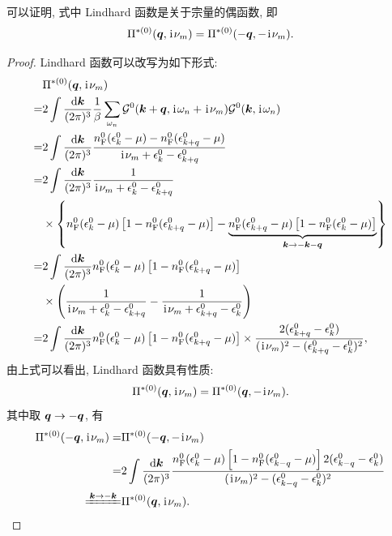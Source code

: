 可以证明, 式中 Lindhard 函数是关于宗量的偶函数, 即
\begin{equation}
    \Pi^{*(0)}(\boldsymbol{q},\hspace{0.1em}\mathrm{i}\hspace{0.1em}\nu_m)=\Pi^{*(0)}(-\boldsymbol{q},-\hspace{0.1em}\mathrm{i}\hspace{0.1em}\nu_m).
\end{equation}
\begin{proof}
    Lindhard 函数可以改写为如下形式:
  \begin{align}
         &   \Pi^{*(0)}(\boldsymbol{q},\hspace{0.1em}\mathrm{i}\hspace{0.1em}\nu_m)\nonumber\\
=&2\int\frac{\mathrm{d}\boldsymbol{k}}{(2\pi)^3}\frac{1}{\beta}\sum_{\omega_n}\mathcal{G}^{0}(\boldsymbol{k}+\boldsymbol{q},\hspace{0.1em}\mathrm{i}\hspace{0.1em}\omega_n+\hspace{0.1em}\mathrm{i}\hspace{0.1em}\nu_m)\mathcal{G}^{0}(\boldsymbol{k},\hspace{0.1em}\mathrm{i}\hspace{0.1em}\omega_n)\nonumber\\
            =&2\int\frac{\mathrm{d}\boldsymbol{k}}{(2\pi)^3}\frac{n_{\mathrm{F}}^{0}(\epsilon_k^0-\mu)-n_{\mathrm{F}}^{0}(\epsilon_{k+q}^0-\mu)}{\hspace{0.1em}\mathrm{i}\hspace{0.1em}\nu_m+\epsilon_k^0-\epsilon_{k+q}^0}\nonumber\\
            =&2\int\frac{\mathrm{d}\boldsymbol{k}}{(2\pi)^3}\frac{1}{\hspace{0.1em}\mathrm{i}\hspace{0.1em}\nu_m+\epsilon_k^0-\epsilon_{k+q}^0}\nonumber\\
            &\times \left\{ n_{\mathrm{F}}^{0}(\epsilon_k^0-\mu)\left[1-n_{\mathrm{F}}^{0}(\epsilon_{k+q}^0-\mu)\right] - \underbrace{n_{\mathrm{F}}^{0}(\epsilon_{k+q}^0-\mu)\left[ 1-n_{\mathrm{F}}^{0}(\epsilon_k^{0}-\mu)\right]}_{\boldsymbol{k}\to-\boldsymbol{k}-\boldsymbol{q}}\right\} \nonumber\\
            =&2\int\frac{\mathrm{d}\boldsymbol{k}}{(2\pi)^3}n_{\mathrm{F}}^{0}(\epsilon_k^0-\mu)\left[ 1-n_{\mathrm{F}}^{0}(\epsilon_{k+q}^0-\mu) \right] \nonumber\\
            &\times\left( \frac{1}{\hspace{0.1em}\mathrm{i}\hspace{0.1em}\nu_m+\epsilon_k^0-\epsilon_{k+q}^0}-\frac{1}{\hspace{0.1em}\mathrm{i}\hspace{0.1em}\nu_m+\epsilon_{k+q}^0-\epsilon_k^0} \right)\nonumber\\
            =&2\int\frac{\mathrm{d}\boldsymbol{k}}{(2\pi)^3}n_{\mathrm{F}}^{0}(\epsilon_{k}^0-\mu)\left[ 1-n_{\mathrm{F}}^{0}(\epsilon_{k+q}^0-\mu) \right] \times\frac{2(\epsilon_{k+q}^0-\epsilon_k^0)}{(\hspace{0.1em}\mathrm{i}\hspace{0.1em}\nu_m)^2-(\epsilon_{k+q}^0-\epsilon_k^0)^2},
        \end{align}
    由上式可以看出, Lindhard 函数具有性质:
    \begin{equation}
        \Pi^{*(0)}(\boldsymbol{q},\hspace{0.1em}\mathrm{i}\hspace{0.1em}\nu_m)=\Pi^{*(0)}(\boldsymbol{q},-\hspace{0.1em}\mathrm{i}\hspace{0.1em}\nu_m).
    \end{equation}
    其中取 $\boldsymbol{q}\to -\boldsymbol{q}$, 有 
  \begin{align}
            \Pi^{*(0)}(-\vct{q},\ii\nu_m)=&\Pi^{*(0)}(-\vct{q},-\ii\nu_m)\nonumber\\
            =&2\int\frac{\dd\vct{k}}{(2\pi)^3}\frac{n_{\fun{F}}^{0}(\epsilon_k^0-\mu)\lmi 1-n_{\fun{F}}^{0}(\epsilon_{k-q}^0-\mu)\rmi 2(\epsilon_{k-q}^0-\epsilon_k^0) }{(\ii\nu_m)^2-(\epsilon_{k-q}^0-\epsilon_k^0)^2}\nonumber\\
            \xlongequal[]{\vct{k}\to -\vct{k}}&\Pi^{*(0)}(\vct{q},\ii\nu_m).
        \end{align}
\end{proof}
